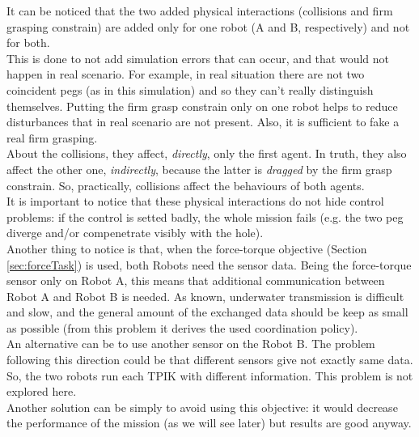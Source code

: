 \vspace{20px}
It can be noticed that the two added physical interactions (collisions and firm grasping constrain) are added only for one robot (A and B, respectively) and not for both.\\
This is done to not add simulation errors that can occur, and that would not happen in real scenario. For example, in real situation there are not two coincident pegs (as in this simulation) and so they can't really distinguish themselves. Putting the firm grasp constrain only on one robot helps to reduce disturbances that in real scenario are not present. Also, it is sufficient to fake a real firm grasping.\\
About the collisions, they affect, \textit{directly}, only the first agent. In truth, they also affect the other one, \textit{indirectly}, because the latter is \textit{dragged} by the firm grasp constrain. So, practically, collisions affect the behaviours of both agents.\\
It is important to notice that these physical interactions do not hide control problems: if the control is setted badly, the whole mission fails (e.g. the two peg diverge and/or compenetrate visibly with the hole).\\
Another thing to notice is that, when the force-torque objective (Section \ref{sec:forceTask}) is used, both Robots need the sensor data. Being the force-torque sensor only on Robot A, this means that additional communication between Robot A and Robot B is needed. As known, underwater transmission is difficult and slow, and the general amount of the exchanged data should be keep as small as possible (from this problem it derives the used coordination policy).\\ 
An alternative can be to use another sensor on the Robot B. The problem following this direction could be that different sensors give not exactly same data. So, the two robots run each TPIK with different information. This problem is not explored here.\\
Another solution can be simply to avoid using this objective: it would decrease the performance of the mission (as we will see later) but results are good anyway.

